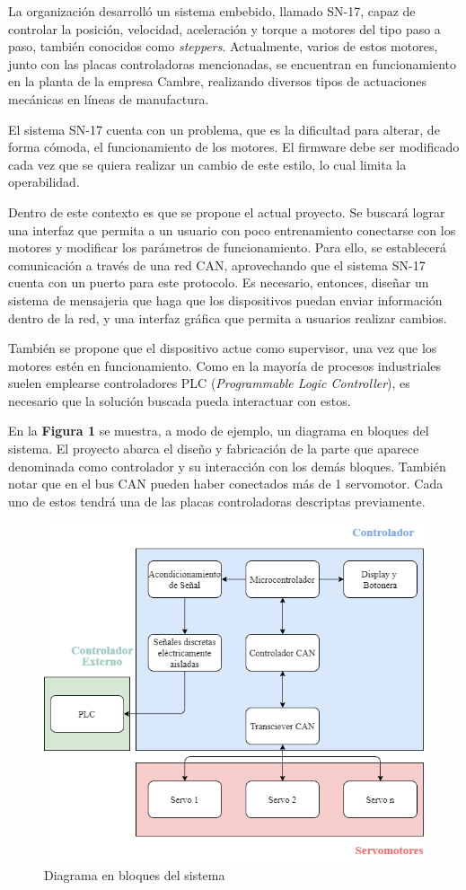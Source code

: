 \documentclass[
11pt, %
]{charter}
\begin{document}
La organización \empclientename{} desarrolló un sistema embebido, llamado SN-17, capaz de controlar la posición, velocidad, aceleración y torque a motores del tipo paso a paso, también conocidos como \textit{steppers}. Actualmente, varios de estos motores, junto con las placas controladoras mencionadas, se encuentran en funcionamiento en la planta de la empresa Cambre, realizando diversos tipos de actuaciones mecánicas en líneas de manufactura.

El sistema SN-17 cuenta con un problema, que es la dificultad para alterar, de forma cómoda, el funcionamiento de los motores. El firmware debe ser modificado cada vez que se quiera realizar un cambio de este estilo, lo cual limita la operabilidad. 

Dentro de este contexto es que se propone el actual proyecto. Se buscará lograr una interfaz que permita a un usuario con poco entrenamiento conectarse con los motores y modificar los parámetros de funcionamiento. Para ello, se establecerá comunicación a través de una red CAN, aprovechando que el sistema SN-17 cuenta con un puerto para este protocolo. Es necesario, entonces, diseñar un sistema de mensajeria que haga que los dispositivos puedan enviar información dentro de la red, y una interfaz gráfica que permita a usuarios realizar cambios.

También se propone que el dispositivo actue como supervisor, una vez que los motores estén en funcionamiento. Como en la mayoría de procesos industriales suelen emplearse controladores PLC (\textit{Programmable Logic Controller}), es necesario que la solución buscada pueda interactuar con estos.

En la \textbf{Figura 1} se muestra, a modo de ejemplo, un diagrama en bloques del sistema. El proyecto abarca el diseño y fabricación de la parte que aparece denominada como controlador y su interacción con los demás bloques. También notar que en el bus CAN pueden haber conectados más de 1 servomotor. Cada uno de estos tendrá una de las placas controladoras descriptas previamente.

\begin{figure}[htpb]
\centering 
\includegraphics[width=.8\textwidth]{./Figuras/CAN_Servo_controller.png}
\caption{Diagrama en bloques del sistema}
\label{fig:diagBloques}
\end{figure}
\end{document}
